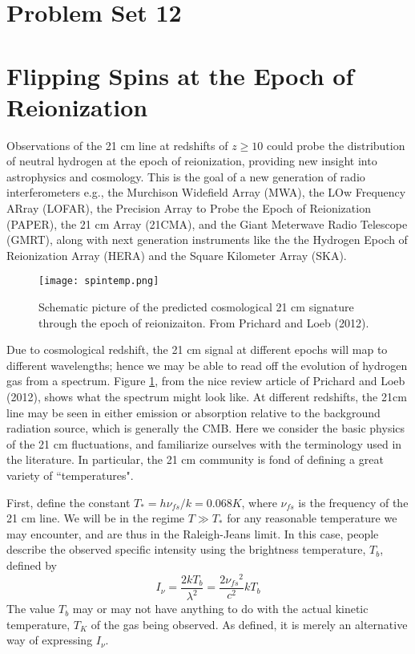 \documentclass[11pt]{article}
\begin{document}
\pagestyle{empty}

\def\nufs{{\nu_{fs}}}
\section*{\centering Problem Set 12}

\section{Flipping Spins at the Epoch of Reionization}

Observations of the 21 cm line at redshifts of $z\ge10$ could probe the
distribution of neutral hydrogen at the epoch of reionization, providing new
insight into astrophysics and cosmology. This is the goal of a new generation
of radio interferometers e.g., the Murchison Widefield Array (MWA), the LOw
Frequency ARray (LOFAR), the Precision Array to Probe the Epoch of Reionization
(PAPER), the 21 cm Array (21CMA), and the Giant Meterwave Radio Telescope
(GMRT), along with next generation instruments like the 
the Hydrogen Epoch of Reionization Array (HERA) and the
Square Kilometer Array (SKA).

\begin{figure}[!ht]
\texttt{[image: spintemp.png]}
\caption{
Schematic picture of the predicted cosmological 21 cm signature through the
epoch of reionizaiton. From Prichard and Loeb (2012).
}\label{fig:spintemp}
\end{figure}

Due to cosmological redshift, the 21 cm signal at different epochs will map to
different wavelengths; hence we may be able to read off the evolution of
hydrogen gas from a spectrum. Figure \ref{fig:spintemp}, from the nice review article of
Prichard and Loeb (2012), shows what the spectrum might look like. At
different redshifts, the 21cm line may be seen in either emission or absorption
relative to the background radiation source, which is generally the CMB. Here
we consider the basic physics of the 21 cm fluctuations, and familiarize
ourselves with the terminology used in the literature. In particular, the 21 cm
community is fond of defining a great variety of ``temperatures".

First, define the constant $T_*=h\nufs/k=0.068 K$, where $\nufs$ is the
frequency of the 21 cm line. We will be in the regime $T\gg T_*$ for any reasonable
temperature we may encounter, and are thus in the Raleigh-Jeans limit. In this
case, people describe the observed specific intensity using the brightness
temperature, $T_b$, defined by
\begin{equation}
I_\nu=\frac{2kT_b}{\lambda^2}=\frac{2\nufs^2}{c^2}kT_b
\end{equation}
The value $T_b$ may or may not have anything to do with the actual kinetic
temperature, $T_K$ of the gas being observed. As defined, it is merely an
alternative way of expressing $I_\nu$.
\end{document}
